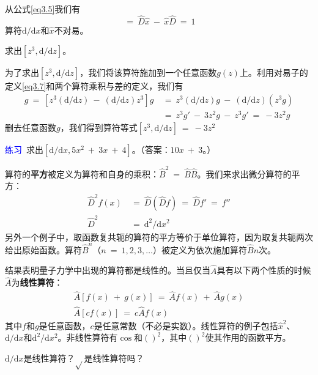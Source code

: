 \documentclass[12pt,a4paper,openany]{ctexbook}
\begin{document}
\begin{flushleft}
从公式\eqref{eq3.5}我们有
\begin{equation}
    [\frac{\mathrm{d}}{\mathrm{d}x},\hat{x}]\ =\ \hat{D}\hat{x}\ -\ \hat{x}\hat{D}\ =\ 1 \label{eq3.8}
\end{equation}
算符$\mathrm{d}/\mathrm{d}x$和$\hat{x}$不对易。
\begin{examplebox}
    \setlength{\parindent}{2em}
求出$[z^3,\mathrm{d}/\mathrm{d}z]$。
    
为了求出$[z^3,\mathrm{d}/\mathrm{d}z]$，我们将该算符施加到一个任意函数$g(z)$上。利用对易子的定义\eqref{eq3.7}和两个算符乘积与差的定义，我们有
\begin{align*}
    [z^3,\mathrm{d}/\mathrm{d}z]g\ =\ [z^3(\mathrm{d}/\mathrm{d}z)\ -\ (\mathrm{d}/\mathrm{d}z)z^3]g\ &=\  z^3(\mathrm{d}/\mathrm{d}z)g\ -\ (\mathrm{d}/\mathrm{d}z)(z^3g) \\
    &=\ z^3g'\ -\ 3z^2g\ -\ z^3g'\ =\ -3z^2g
\end{align*}
删去任意函数$g$，我们得到算符等式$[z^3,\mathrm{d}/\mathrm{d}z]\ =\ -3z^2$

\textcolor{blue}{\large 练习}\ 求出$[\mathrm{d}/\mathrm{d}x,5x^2\ +\ 3x\ +\ 4]$。（答案：$10x\ +\ 3$。）
\end{examplebox}

算符的\textbf{平方}被定义为算符和自身的乘积：$\hat{B}^2\ =\ \hat{B}\hat{B}$。我们来求出微分算符的平方：
\begin{align*}
    \hat{D}^2f(x)\ &=\ \hat{D}(\hat{D}f)\ =\ \hat{D}f'\ =\ f'' \\
    \hat{D}^2\ &=\ \mathrm{d}^2/\mathrm{d}x^2
\end{align*}
另外一个例子中，取函数复共轭的算符的平方等价于单位算符，因为取复共轭两次给出原始函数。算符$\hat{B}^n$（$n\ =\ 1,2,3,\dots$）被定义为依次施加算符$\hat{B}$$n$次。

结果表明量子力学中出现的算符都是线性的。当且仅当$\hat{A}$具有以下两个性质的时候$\hat{A}$为\textbf{线性算符}：
\begin{gather}
    \boxed{\hat{A}[f(x)\ +\ g(x)]\ =\ \hat{A}f(x)\ +\ \hat{A}g(x)} \label{eq3.9} \\
    \boxed{\hat{A}[cf(x)]\ =\ c\hat{A}f(x)} \label{eq3.10}
\end{gather}
其中$f$和$g$是任意函数，$c$是任意常数（不必是实数）。线性算符的例子包括$\hat{x}^2$、$\mathrm{d}/\mathrm{d}x$和$\mathrm{d}^2/\mathrm{d}x^2$。非线性算符有$\cos$和$()^2$，其中$()^2$使其作用的函数平方。

\begin{examplebox}
    \setlength{\parindent}{2em}
$\mathrm{d}/\mathrm{d}x$是线性算符？$\sqrt{}$是线性算符吗？


\end{examplebox}
\end{flushleft}
\end{document}
